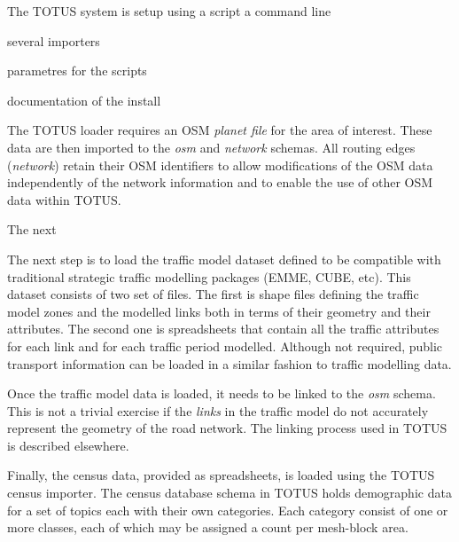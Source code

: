 The TOTUS system is setup using a script
a command line

several importers

parametres for the scripts

documentation of the install

 The TOTUS
loader requires an OSM \textit{planet file} for the area of interest. These data are then imported to the \textit{osm}  and \textit{network} schemas.  All routing edges (\textit{network}) retain their OSM identifiers to allow modifications of the OSM data independently of the network information and to enable the use of other OSM data within TOTUS.

The next 

The next step is to load the traffic model dataset defined to be compatible with traditional strategic traffic modelling packages (EMME, CUBE, etc). This dataset consists of two set of files. The first is shape files defining the traffic model zones and the modelled links both in terms of their geometry and their attributes. The second one is spreadsheets that contain all the traffic attributes for each link and for each traffic period modelled. Although not required, public transport information can be loaded in a similar fashion to traffic modelling data.

Once the traffic model data is loaded, it needs to be linked to the \textit{osm} schema. This is not a trivial exercise if the \textit{links} in the traffic model do not accurately represent the geometry of the road network. The linking process used in TOTUS is described elsewhere\cite{dummy_temp}. 

Finally, the census data, provided as spreadsheets, is loaded using the TOTUS census importer. The census
database schema in TOTUS holds demographic data for a set of topics
each with their own categories. Each category consist of one or more
classes, each of which may be assigned a count per mesh-block area.

